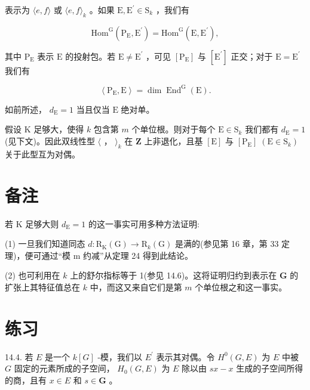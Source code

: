 \documentclass[10pt]{article}
\begin{document}
表示为 \(\langle e,f\rangle\) 或 \(\langle e,f{\rangle }_{k}\) 。如果 \(\mathrm{E},{\mathrm{E}}^{\prime } \in  {\mathrm{S}}_{k}\) ，我们有

\[
{\mathrm{{Hom}}}^{\mathrm{G}}\left( {{\mathrm{P}}_{\mathrm{E}},{\mathrm{E}}^{\prime }}\right)  = {\mathrm{{Hom}}}^{\mathrm{G}}\left( {\mathrm{E},{\mathrm{E}}^{\prime }}\right) ,
\]

其中 \({\mathrm{P}}_{\mathrm{E}}\) 表示 \(\mathrm{E}\) 的投射包。若 \(\mathrm{E} \neq  {\mathrm{E}}^{\prime }\) ，可见 \(\left\lbrack  {\mathrm{P}}_{\mathrm{E}}\right\rbrack\) 与 \(\left\lbrack  {\mathrm{E}}^{\prime }\right\rbrack\) 正交；对于 \(\mathrm{E} = {\mathrm{E}}^{\prime }\) 我们有

\[
\left\langle  {{\mathrm{P}}_{\mathrm{E}},\mathrm{E}}\right\rangle   = \dim {\operatorname{End}}^{\mathrm{G}}\left( \mathrm{E}\right) .
\]

如前所述， \({d}_{\mathrm{E}} = 1\) 当且仅当 \(\mathrm{E}\) 绝对单。

假设 \(\mathrm{K}\) 足够大，使得 \(k\) 包含第 \(m\) 个单位根。则对于每个 \(\mathrm{E} \in  {\mathrm{S}}_{k}\) 我们都有 \({d}_{\mathrm{E}} = 1\) (见下文)。因此双线性型 \(\langle\) ， \({\rangle }_{k}\) 在 \(\mathbf{Z}\) 上非退化，且基 \(\left\lbrack  \mathrm{E}\right\rbrack\) 与 \(\left\lbrack  {\mathrm{P}}_{\mathrm{E}}\right\rbrack \; \left( {\mathrm{E} \in  {\mathrm{S}}_{k}}\right)\) 关于此型互为对偶。

\section*{备注}

若 \(\mathrm{K}\) 足够大则 \({d}_{\mathrm{E}} = 1\) 的这一事实可用多种方法证明:

(1) 一旦我们知道同态 \(d : {\mathrm{R}}_{\mathrm{K}}\left( \mathrm{G}\right)  \rightarrow  {\mathrm{R}}_{k}\left( \mathrm{G}\right)\) 是满的(参见第 16 章，第 33 定理)，便可通过“模 m 约减”从定理 24 得到此结论。

(2) 也可利用在 \(k\) 上的舒尔指标等于 1(参见 14.6)。这将证明归约到表示在 \(\mathbf{G}\) 的扩张上其特征值总在 \(k\) 中，而这又来自它们是第 \(m\) 个单位根之和这一事实。

\section*{练习}

14.4. 若 \(E\) 是一个 \(k\left\lbrack  G\right\rbrack\) -模，我们以 \({E}^{\prime }\) 表示其对偶。令 \({H}^{0}\left( {G,E}\right)\) 为 \(E\) 中被 \(G\) 固定的元素所成的子空间， \({H}_{0}\left( {G,E}\right)\) 为 \(E\) 除以由 \({sx} - x\) 生成的子空间所得的商，且有 \(x \in  E\) 和 \(s \in  \mathbf{G}\) 。
\end{document}

